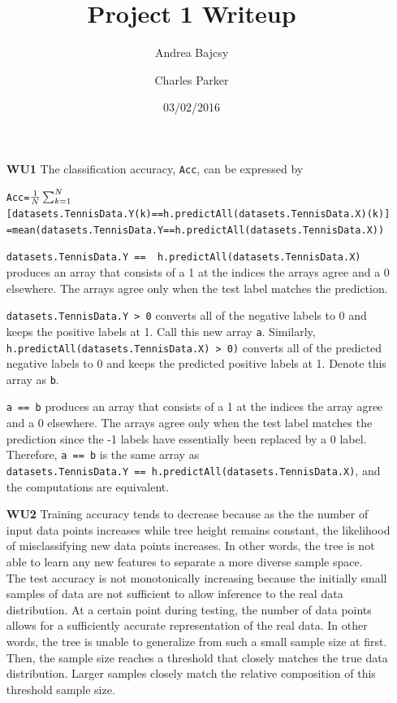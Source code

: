 \documentclass{article}
\title{Project 1 Writeup}
\date{03/02/2016}
\author{Andrea Bajcsy \and Charles Parker}
\begin{document}
	\maketitle
	
	\begin{enumerate}
	
	\item[\textbf{WU1}] The classification accuracy, \verb|Acc|, can be expressed by
	
		\begin{alltt}
			Acc = \(\frac{1}{N} \sum\sb{k=1}\sp{N} \) [ datasets.TennisData.Y(k) == h.predictAll(datasets.TennisData.X)(k) ] \\
			\quad  = mean (datasets.TennisData.Y == h.predictAll(datasets.TennisData.X)) 
		\end{alltt}
	
		\verb|datasets.TennisData.Y ==  h.predictAll(datasets.TennisData.X)| produces an array
		that consists of a 1 at the indices the arrays agree and a 0 elsewhere. The arrays agree
		only when the test label matches the prediction.
	
		\verb|datasets.TennisData.Y > 0| converts all of the negative labels to 0 and keeps the 
		positive labels at 1. Call this new array \verb|a|. Similarly, 
		\verb|h.predictAll(datasets.TennisData.X) > 0)| converts all of the predicted negative
		labels to 0 and keeps the predicted positive labels at 1. Denote this array as \verb|b|.

		\verb|a == b| produces an array that consists of a 1 at the indices the array agree and 
		a 0 elsewhere. The arrays agree only when the test label matches the prediction since the
		-1 labels have essentially been replaced by a 0 label. Therefore, \verb|a == b| is the same
		array as \\
		\verb|datasets.TennisData.Y == h.predictAll(datasets.TennisData.X)|, 
		and the computations are equivalent.
		
	\item[\textbf{WU2}] Training accuracy tends to decrease because as the the number of
		input data points increases while tree height remains constant, the likelihood of
		misclassifying new data points increases. In other words, the tree is not able to learn
		any new features to separate a more diverse sample space. \\
		
		The test accuracy is not monotonically increasing because the initially small samples of
		data are not sufficient to allow inference to the real data distribution. At a certain
		point during testing, the number of data points allows for a sufficiently accurate
		representation of the real data. In other words, the tree is unable to generalize
		from such a small sample size at first. Then, the sample size reaches a threshold
		that closely matches the true data distribution. Larger samples closely match the relative
		composition of this threshold sample size. \\
		

\end{enumerate}
\end{document}
